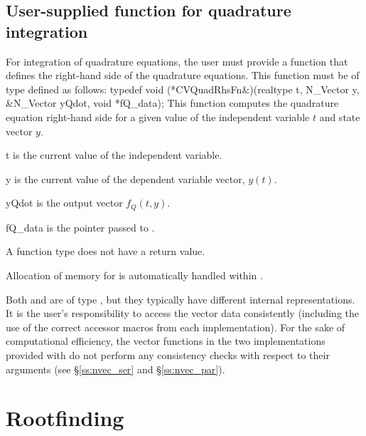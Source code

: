 
\subsection{User-supplied function for quadrature integration}
\label{ss:user_fct_quad}

For integration of quadrature equations, the user must provide a function 
that defines the right-hand side of the quadrature equations. This function
must be of type  defined as follows:
{
  typedef void (*CVQuadRhsFn&)(realtype t, N\_Vector y, \\
                            &N\_Vector yQdot, void *fQ\_data);
}
{
  This function computes the quadrature equation right-hand side for a given value
  of the independent variable $t$ and state vector $y$.
}
{
  \begin{args}[fQ\_data]
  \item[t]
    is the current value of the independent variable.
  \item[y]
    is the current value of the dependent variable vector, $y(t)$.
  \item[yQdot]
    is the output vector $f_Q(t,y)$.
  \item[fQ\_data]
    is the       
    pointer passed to .   
  \end{args}
}
{
  A  function type does not have a return value.
}
{
  Allocation of memory for  is automatically handled within {\cvodes}.

  Both  and  are of type ,
  but they  typically have different internal representations. It is the user's 
  responsibility to access the vector data consistently (including the use of the 
  correct accessor macros from each {\nvector} implementation). For the sake of 
  computational efficiency, the vector functions in the two {\nvector} implementations 
  provided with {\cvodes} do not perform any consistency checks with respect to their 
   arguments (see \S\ref{ss:nvec_ser} and \S\ref{ss:nvec_par}).
}

\section{Rootfinding}\label{s:using_rootfinding}

